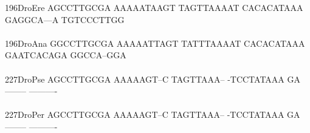 \documentclass[11pt,twoside,reqno,a4paper]{article}
\begin{document}
{196\hspace*{1\charwidth}DroEre	AGCCTTGCGA	AAAAATAAGT	TAGTTAAAAT	CACACATAAA	GAGGCA---A	TGTCCCTTGG	\\
\hspace*{4\charwidth}\hspace*{7\charwidth}\hspace*{1\charwidth}\hspace*{1\charwidth}\hspace*{1\charwidth}\hspace*{1\charwidth}\hspace*{1\charwidth}\hspace*{1\charwidth}\\
196\hspace*{1\charwidth}DroAna	GGCCTTGCGA	AAAAATTAGT	TATTTAAAAT	CACACATAAA	GAATCACAGA	GGCCA--GGA	\\
\hspace*{4\charwidth}\hspace*{7\charwidth}\hspace*{1\charwidth}\hspace*{1\charwidth}\hspace*{1\charwidth}\hspace*{1\charwidth}\hspace*{1\charwidth}\hspace*{1\charwidth}\\
227\hspace*{1\charwidth}DroPse	AGCCTTGCGA	AAAAAGT--C	TAGTTAAA--	-TCCTATAAA	GA--------	----------	\\
\hspace*{4\charwidth}\hspace*{7\charwidth}\hspace*{1\charwidth}\hspace*{1\charwidth}\hspace*{1\charwidth}\hspace*{1\charwidth}\hspace*{1\charwidth}\hspace*{1\charwidth}\\
227\hspace*{1\charwidth}DroPer	AGCCTTGCGA	AAAAAGT--C	TAGTTAAA--	-TCCTATAAA	GA--------	----------	\\
\hspace*{4\charwidth}\hspace*{7\charwidth}\hspace*{1\charwidth}\hspace*{1\charwidth}\hspace*{1\charwidth}\hspace*{1\charwidth}\hspace*{1\charwidth}\hspace*{1\charwidth}\\
}
\end{document}
